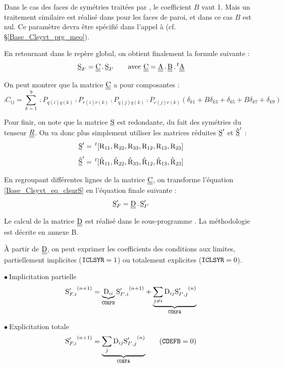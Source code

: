 Dans le cas des faces de sym\'etries trait\'ees par , le
coefficient $B$ vaut 1. Mais un traitement similaire est r\'ealis\'e dans
 pour les faces de paroi, et dans ce cas $B$ est nul. Ce
param\`etre devra \^etre sp\'ecifi\'e dans l'appel \`a 
(cf. \S\ref{Base_Clsyvt_prg_meo}).

En retournant dans le rep\`ere global, on obtient finalement la formule suivante
:
\begin{equation}
\label{Base_Clsyvt_eq_clsurS}
\underline{\textrm{S}}_F=\underline{\underline{\textrm{C}}}\,.\,\underline{\textrm{S}}_{I'}\qquad
\text{avec }\underline{\underline{\textrm{C}}}=\underline{\underline{\textrm{A}}}\,.\,\underline{\underline{\textrm{B}}}\,.\,^t\underline{\underline{\textrm{A}}}
\end{equation}

On peut montrer que la matrice $\underline{\underline{\textrm{C}}}$ a pour composantes :
\begin{equation}
\comp{C}_{ij}=\sum_{k=1}^9
\comp{P}_{q(i)q(k)}\comp{P}_{r(i)r(k)}\comp{P}_{q(j)q(k)}\comp{P}_{r(j)r(k)}
(\delta_{k1}+B\delta_{k3}+\delta_{k5}+B\delta_{k7}+\delta_{k9})
\end{equation}


Pour finir, on note que la matrice $\underline{\textrm{S}}$ est redondante, du fait des
sym\'etries du tenseur $\underline{\underline{R}}$. On va donc plus simplement utiliser les
matrices r\'eduites $\underline{\textrm{S}}^\prime$ et $\hat{\underline{\textrm{S}}}^\prime$ :
\begin{equation}
\underline{\textrm{S}}^\prime=\,^t[\textrm{R}_{11},\textrm{R}_{22},\textrm{R}_{33},
\textrm{R}_{12},\textrm{R}_{13},\textrm{R}_{23}]
\end{equation}
\begin{equation}
\hat{\underline{\textrm{S}}}^\prime=\,^t[\hat{\textrm{R}}_{11},\hat{\textrm{R}}_{22},\hat{\textrm{R}}_{33},
\hat{\textrm{R}}_{12},\hat{\textrm{R}}_{13},\hat{\textrm{R}}_{23}]
\end{equation}

En regroupant diff\'erentes lignes de la matrice $\underline{\underline{\textrm{C}}}$, on transforme
l'\'equation \ref{Base_Clsyvt_eq_clsurS} en l'\'equation finale suivante :
\begin{equation}
\underline{\textrm{S}}_F^\prime=\underline{\underline{\textrm{D}}}\,.\,\underline{\textrm{S}}_{I'}^\prime
\end{equation}

Le calcul de la matrice $\underline{\underline{\textrm{D}}}$ est r\'ealis\'e dans le sous-programme
. La m\'ethodologie est d\'ecrite en annexe B.

\`A partir de $\underline{\underline{\textrm{D}}}$, on peut exprimer les coefficients des conditions aux
limites, partiellement implicites ($\text{\texttt{ICLSYR}}=1$) ou totalement explicites
($\text{\texttt{ICLSYR}}=0$).

$\bullet\ ${\sc Implicitation partielle}\\
\begin{equation}
\label{Base_Clsyvt_eq_clRimp}
{\textrm{S}_{F,i}^\prime}^{(n+1)} =
\underbrace{\textrm{D}_{ii}}_{\text{\texttt{COEFB}}}{\textrm{S}_{I',i}^\prime}^{(n+1)}
+\underbrace{\sum_{j\ne i}\textrm{D}_{ij}{\textrm{S}_{I',j}^\prime}^{(n)}}_{\text{\texttt{COEFA}}}
\end{equation}

$\bullet\ ${\sc Explicitation totale}\\
\begin{equation}
\label{Base_Clsyvt_eq_clRexp}
{\textrm{S}_{F,i}^\prime}^{(n+1)} =
\underbrace{\sum_j\textrm{D}_{ij}{\textrm{S}_{I',j}^\prime}^{(n)}}_{\text{\texttt{COEFA}}}
\qquad(\text{\texttt{COEFB}}=0)
\end{equation}
